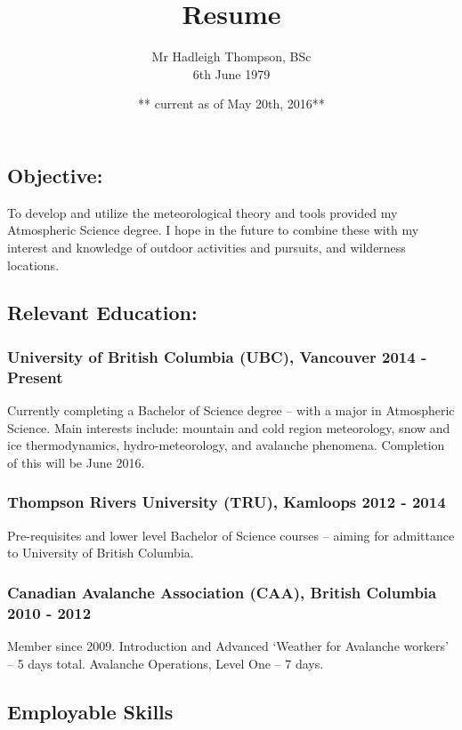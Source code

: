\documentclass[]{article}
\title{Resume}
\author{Mr Hadleigh Thompson, BSc \\ 6th June 1979}
\date{\scriptsize{** current as of May 20th, 2016**}}
\begin{document}
\maketitle

\subsection*{Objective:}  
To develop and utilize the meteorological theory and tools provided my Atmospheric Science degree. I
hope in the future to combine these with my interest and knowledge of outdoor activities and pursuits, and wilderness locations. 

\subsection*{Relevant Education:}
\subsubsection*{University of British Columbia (UBC), Vancouver 2014 - Present}
Currently completing a Bachelor of Science degree – with a major in Atmospheric Science. Main
interests include: mountain and cold region meteorology, snow and ice thermodynamics,
hydro-meteorology, and avalanche phenomena. Completion of this will be June 2016.
\subsubsection*{Thompson Rivers University (TRU), Kamloops 2012 - 2014}
Pre-requisites and lower level Bachelor of Science courses – aiming for admittance to University of British
Columbia.
\subsubsection*{Canadian Avalanche Association (CAA), British Columbia 2010 - 2012}
Member since 2009. Introduction and Advanced ‘Weather for Avalanche workers’ – 5 days total. Avalanche Operations, Level One – 7 days.

\subsection*{Employable Skills}
\end{document}
